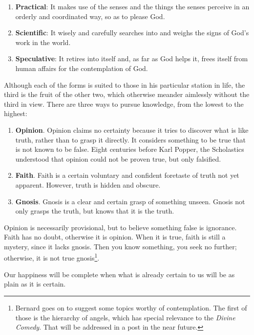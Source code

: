 \begin{enumerate}
\item \textbf{Practical}: It makes use of the senses and the things the senses perceive in an orderly and coordinated way, so as to please God. 
\item \textbf{Scientific}: It wisely and carefully searches into and weighs the signs of God's work in the world. 
\item \textbf{Speculative}: It retires into itself and, as far as God helps it, frees itself from human affairs for the contemplation of God. 
\end{enumerate}
Although each of the forms is suited to those in his particular station in life, the third is the fruit of the other two, which otherwise meander aimlessly without the third in view. There are three ways to pursue knowledge, from the lowest to the highest:

\begin{enumerate}
\item \textbf{Opinion}. Opinion claims no certainty because it tries to discover what is like truth, rather than to grasp it directly. It considers something to be true that is not known to be false. Eight centuries before Karl Popper, the Scholastics understood that opinion could not be proven true, but only falsified. 
\item \textbf{Faith}. Faith is a certain voluntary and confident foretaste of truth not yet apparent. However, truth is hidden and obscure. 
\item \textbf{Gnosis}. Gnosis is a clear and certain grasp of something unseen. Gnosis not only grasps the truth, but knows that it is the truth. 
\end{enumerate}
Opinion is necessarily provisional, but to believe something false is ignorance. Faith has no doubt, otherwise it is opinion. When it is true, faith is still a mystery, since it lacks gnosis. Then you know something, you seek no further; otherwise, it is not true gnosis\footnote{Bernard goes on to suggest some topics worthy of contemplation. The first of those is the hierarchy of angels, which has special relevance to the \emph{Divine Comedy}. That will be addressed in a post in the near future.}.

\begin{quotex}
Our happiness will be complete when what is already certain to us will be as plain as it is certain. 

\end{quotex}

